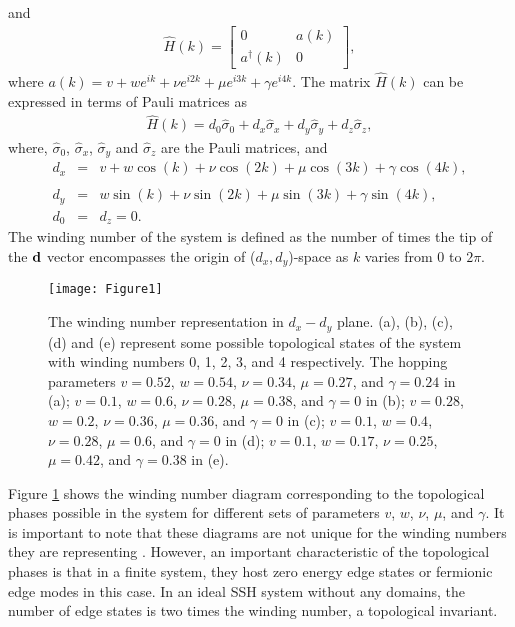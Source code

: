 \documentclass[aps,pra,reprint,superscriptaddress,longbibliography]{revtex4-2}
\begin{document}
and 
 \begin{eqnarray}
\hat{H}(k)=\begin{bmatrix}	0 & a(k) \\
a^{\dagger}(k) & 0 \end{bmatrix},
\end{eqnarray} 
where $a(k)=v+we^{ik}+\nu e^{i2k} + \mu e^{i3k}+\gamma e^{i4k}$. The matrix $\hat{H}(k)$  can be expressed in terms of Pauli matrices as
\begin{eqnarray}
\hat{H}(k)=d_0\hat{\sigma}_0 + d_x\hat{\sigma}_x + d_y\hat{\sigma}_y + d_z\hat{\sigma}_z,
\end{eqnarray} 
where,  $\hat{\sigma}_0$, $\hat{\sigma}_x$,  $\hat{\sigma}_y$ and $\hat{\sigma}_z$  are the Pauli matrices, and
\begin{eqnarray}
d_x&=&v+w\cos(k)+\nu\cos(2k) + \mu\cos(3k) + \gamma \cos(4k),  \nonumber \\
\\
d_y&=&w\sin(k)+\nu\sin(2k) + \mu\sin(3k) + \gamma \sin(4k), \\
d_0&=&d_z=0.
\end{eqnarray} 
The winding number of the system is defined as the number of times the tip of the ${\bf d}$ vector encompasses the origin of ($d_x,d_y$)-space as $k$ varies from $0$ to $2 \pi$.

\begin{figure}
	\centering
	\texttt{[image: Figure1]}
	\caption{The winding number representation in $d_x - d_y$ plane. (a), (b), (c), (d) and (e) represent some possible topological states of the system with winding numbers 0, 1, 2, 3, and 4 respectively. The hopping parameters $ v=0.52 $, $ w= 0.54 $, $ \nu= 0.34 $, $ \mu= 0.27 $, and $ \gamma= 0.24 $ in (a); $ v= 0.1 $, $ w = 0.6 $, $ \nu = 0.28 $, $ \mu =0.38 $, and $ \gamma = 0 $ in (b); $ v = 0.28 $, $ w = 0.2 $, $ \nu = 0.36 $, $ \mu = 0.36 $, and $ \gamma = 0 $ in (c); $ v = 0.1 $, $ w = 0.4 $, $ \nu = 0.28 $, $ \mu = 0.6 $, and $ \gamma = 0 $ in (d); $ v = 0.1 $, $ w = 0.17 $, $ \nu = 0.25 $, $ \mu = 0.42 $, and $ \gamma = 0.38 $ in (e).}
	\label{fig:figure1}
		\vspace{-0.5cm}
\end{figure}


Figure \ref{fig:figure1} shows the winding number diagram corresponding to the topological phases possible in the system for different sets of parameters $v$, $w$, $\nu$, $\mu$, and $\gamma$. It is important to note that these diagrams are not unique for the winding numbers they are representing \cite{asboth2016short}. However, an important characteristic of the topological phases is that in a finite system, they host zero energy edge states or fermionic edge modes in this case. In an ideal SSH system without any domains, the number of edge states is two times the winding number, a topological invariant.
\end{document}
